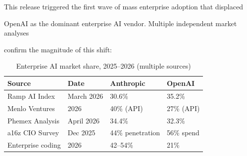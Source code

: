 This release triggered the first wave of mass enterprise adoption that displaced





OpenAI as the dominant enterprise AI vendor. Multiple independent market analyses





confirm the magnitude of this shift:











\begin{table}[h]





\centering





\caption{Enterprise AI market share, 2025--2026 (multiple sources)}





\begin{tabular}{llll}





\toprule





\textbf{Source} & \textbf{Date} & \textbf{Anthropic} & \textbf{OpenAI} \\





\midrule





Ramp AI Index & March 2026 & 30.6\% & 35.2\% \\





Menlo Ventures & 2026 & 40\% (API) & 27\% (API) \\





Phemex Analysis & April 2026 & 34.4\% & 32.3\% \\





a16z CIO Survey & Dec 2025 & 44\% penetration & 56\% spend \\





Enterprise coding & 2026 & 42--54\% & 21\% \\





\bottomrule





\end{tabular}





\end{table}
